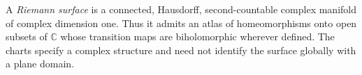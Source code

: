 
A \emph{Riemann surface} is a connected, Hausdorff, second-countable complex manifold of complex dimension one. Thus it admits an atlas of homeomorphisms onto open subsets of $\mathbb C$ whose transition maps are biholomorphic wherever defined. The charts specify a complex structure and need not identify the surface globally with a plane domain.

